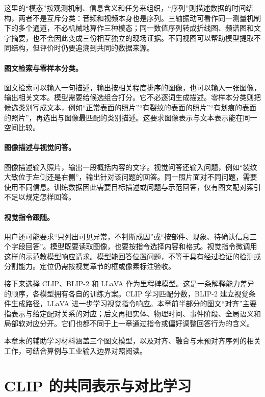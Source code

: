 这里的“模态”按观测机制、信息含义和任务来组织，“序列”则描述数据的时间结构，两者不是互斥分类：音频和视频本身也是序列。三轴振动可看作同一测量机制下的多个通道，不必机械地算作三种模态；同一数值序列转成折线图、频谱图和文字摘要，也不会因此变成三份相互独立的现场证据。不同视图可以帮助模型提取不同结构，但评价时仍要追溯到共同的数据来源。

\paragraph{图文检索与零样本分类。}
图文检索可以输入一句描述，输出按相关程度排序的图像，也可以输入一张图像，输出相关文本。模型需要给候选组合打分。它不必逐词生成描述。零样本分类则把候选类别写成文本，例如“正常表面的照片”“有裂纹的表面的照片”“有划痕的表面的照片”，再选出与图像最匹配的类别描述。这要求图像表示与文本表示能在同一空间比较。

\paragraph{图像描述与视觉问答。}
图像描述输入照片，输出一段概括内容的文字。视觉问答还输入问题，例如“裂纹大致位于左侧还是右侧”，输出针对该问题的回答。同一照片面对不同问题，需要使用不同信息。训练数据因此需要目标描述或问题与示范回答，仅有图文配对索引不足以规定怎样回答。

\paragraph{视觉指令跟随。}
用户还可能要求“只列出可见异常，不判断成因”或“按部件、现象、待确认信息三个字段回答”。模型既要读取图像，也要按指令选择内容和格式。视觉指令微调用这样的示范教模型响应请求。模型能回答位置问题，不等于具有经过验证的检测或分割能力。定位仍需按视觉章节的框或像素标注验收。

接下来选择 CLIP、BLIP-2 和 LLaVA 作为里程碑模型。这是一条解释能力差异的顺序，各模型拥有各自的训练方案。CLIP 学习匹配分数，BLIP-2 建立视觉条件生成路径，LLaVA 进一步学习视觉指令响应。本章前半部分的图文“对齐”主要指表示与给定配对关系的对应；后文再把实体、物理时间、事件阶段、全局语义和局部软对应分开。它们也都不同于上一章通过指令或偏好调整回答行为的含义。

本章末的辅助学习材料涵盖三个图文模型，以及对齐、融合与未预对齐序列的相关工作，可结合算例与工业输入边界对照阅读。

\section{CLIP 的共同表示与对比学习}
